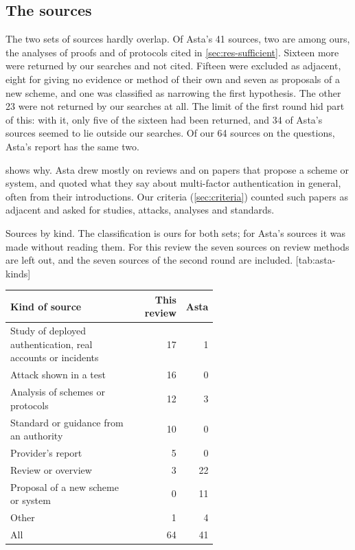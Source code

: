 \begin{refsection}
\subsection{The sources}

The two sets of sources hardly overlap.
Of Asta's 41 sources, two are among ours, the analyses of proofs and of
protocols cited in \cref{sec:res-sufficient}.
Sixteen more were returned by our searches and not cited.
Fifteen were excluded as adjacent, eight for giving no evidence or
method of their own and seven as proposals of a new scheme, and one was
classified as narrowing the first hypothesis.
The other 23 were not returned by our searches at all.
The limit of the first round hid part of this: with it, only five of
the sixteen had been returned, and 34 of Asta's sources seemed to lie
outside our searches.
Of our 64 sources on the questions, Asta's report has the same two.

 shows why.
Asta drew mostly on reviews and on papers that propose a scheme or
system, and quoted what they say about multi-factor authentication in
general, often from their introductions.
Our criteria (\cref{sec:criteria}) counted such papers as adjacent and
asked for studies, attacks, analyses and standards.
\begin{table}
  \begin{sidecaption}{%
    Sources by kind.
    The classification is ours for both sets; for Asta's sources it was
    made without reading them.
    For this review the seven sources on review methods are left out,
    and the seven sources of the second round are included.
  }[tab:asta-kinds]
    \footnotesize
    \begin{tabular}{@{}L{0.60\linewidth}rr@{}}
      \toprule
      Kind of source & This review & Asta \\
      \midrule
      Study of deployed authentication, real accounts or incidents
        & 17 & 1 \\
      Attack shown in a test & 16 & 0 \\
      Analysis of schemes or protocols & 12 & 3 \\
      Standard or guidance from an authority & 10 & 0 \\
      Provider's report & 5 & 0 \\
      Review or overview & 3 & 22 \\
      Proposal of a new scheme or system & 0 & 11 \\
      Other & 1 & 4 \\
      \midrule
      All & 64 & 41 \\
      \bottomrule
    \end{tabular}
  \end{sidecaption}
\end{table}


\end{refsection}
